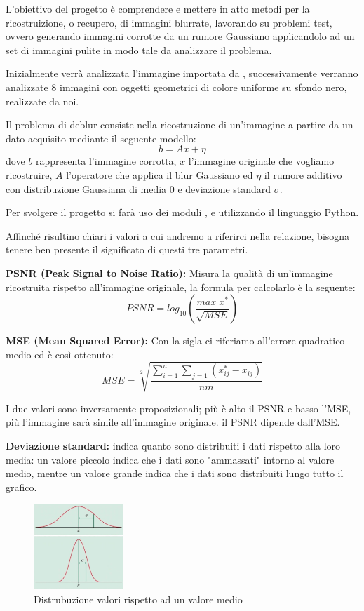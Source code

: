 L'obiettivo del progetto è comprendere e mettere in atto metodi per la ricostruizione, o recupero, di 
immagini blurrate, lavorando su problemi test, ovvero generando immagini corrotte da un rumore 
Gaussiano applicandolo ad un set di immagini pulite in modo tale da analizzare il problema. 

Inizialmente verrà analizzata l'immagine  importata da
, successivamente verranno analizzate 8 immagini con oggetti geometrici
 di colore uniforme su sfondo nero, realizzate da noi.

Il problema di deblur consiste nella ricostruzione di un'immagine a partire da un dato acquisito
 mediante il seguente modello:
\[b=Ax+\eta\]
dove $b$ rappresenta l'immagine corrotta, $x$ l'immagine originale che vogliamo ricostruire, $A$ 
l'operatore che applica il blur Gaussiano ed $\eta$ il rumore additivo con distribuzione Gaussiana di
 media 0 e deviazione standard $\sigma$.

Per svolgere il progetto si farà uso dei moduli ,  e 
utilizzando il linguaggio Python.

Affinché risultino chiari i valori a cui andremo a riferirci nella relazione, bisogna tenere ben presente 
il significato di questi tre parametri. 

\textbf{PSNR (Peak Signal to Noise Ratio):} Misura la qualità di un'immagine ricostruita rispetto all'immagine 
originale, la formula per calcolarlo è la seguente: \[PSNR = log_{10}(\frac{max\;x^\ast}{\sqrt{MSE}})\]

\textbf{MSE (Mean Squared Error):}  Con la sigla ci riferiamo all'errore quadratico medio ed è così ottenuto:
 \[MSE = \sqrt[2]{\frac{\sum_{i=1}^n\sum_{j=1}(x^{\ast}_{ij}-x_{ij})}{nm}}\]

I due valori sono inversamente proposizionali; più è alto il PSNR e basso l'MSE, più l'immagine sarà 
simile all'immagine originale. il PSNR dipende dall'MSE.

\textbf{Deviazione standard:} indica quanto sono distribuiti i dati rispetto alla loro media: 
un valore piccolo indica che i dati sono "ammassati" intorno al valore medio, 
mentre un valore grande indica che i dati sono distribuiti lungo tutto il grafico.

\begin{figure}[H]\centering
	\includegraphics[width=0.3\textwidth]{MANCANTI/deviazione standard.jpg}
	\caption{Distrubuzione valori rispetto ad un valore medio}
\end{figure}
